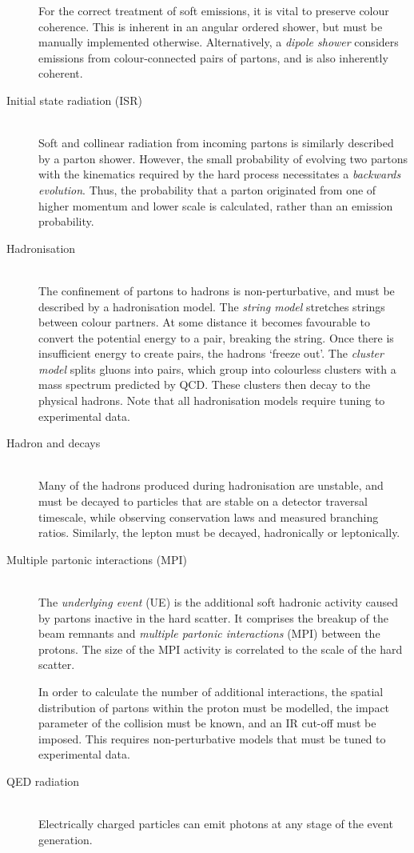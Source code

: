\begin{description}
	For the correct treatment of soft emissions, it is vital to preserve colour 
	coherence. This is inherent in an angular ordered shower, but must be manually 
	implemented otherwise. Alternatively, a \textit{dipole shower} considers emissions 
	from colour-connected pairs of partons, and is also inherently coherent.
\item[Initial state radiation (ISR)] \hfill \\
	Soft and collinear radiation from incoming partons is similarly described by a parton 
	shower. However, the small probability of evolving two partons with the kinematics 
	required by the hard process necessitates a \textit{backwards evolution}. Thus, the 
	probability that a parton originated from one of higher momentum and lower scale is 
	calculated, rather than an emission probability.
\item[Hadronisation] \hfill \\
	The confinement of partons to hadrons is non-perturbative, and must be described by a 
	hadronisation model. The \textit{string model} stretches strings between colour 
	partners. At some distance it becomes favourable to convert the potential energy to a 
	\HepProcess{\Pquark \APquark} pair, breaking the string. Once there is insufficient 
	energy to create \HepProcess{\Pquark \APquark} pairs, the hadrons `freeze out'. The 
	\textit{cluster model} splits gluons into \HepProcess{\Pquark \APquark} pairs, which 
	group into colourless clusters with a mass spectrum predicted by QCD. These 
	clusters then decay to the physical hadrons. Note that all hadronisation models 
	require tuning to experimental data.
\item[Hadron and \Ptau decays] \hfill \\
	Many of the hadrons produced during hadronisation are unstable, and must be decayed to
	particles that are stable on a detector traversal timescale, while observing 
	conservation laws and measured branching ratios. Similarly, the \Ptau lepton must be 
	decayed, hadronically or leptonically.
\item[Multiple partonic interactions (MPI)] \hfill \\
	The \textit{underlying event} (UE) is the additional soft hadronic activity caused by 
	partons inactive in the hard scatter. It comprises the breakup of the beam remnants 
	and \textit{multiple partonic interactions} (MPI) between the protons. The size of 
	the MPI activity is correlated to the scale of the hard scatter. 

	In order to calculate the number of additional interactions, the spatial distribution 
	of partons within the proton must be modelled, the impact parameter of the \pp 
	collision must be known, and an IR cut-off must be imposed. This requires 
	non-perturbative models that must be tuned to experimental data.
\item[QED radiation] \hfill \\
	Electrically charged particles can emit photons at any stage of the event generation.
\end{description}




